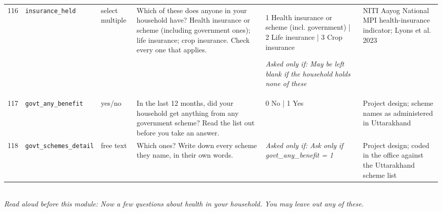 \documentclass[9pt,a4paper,landscape]{article}
\begin{document}
\begin{longtable}{@{}p{0.5cm}p{3.3cm}p{1.7cm}p{7.3cm}p{5.6cm}p{5.4cm}@{}}
\footnotesize 116 & \footnotesize\texttt{insurance\_held} & \scriptsize select multiple & \footnotesize Which of these does anyone in your household have? Health insurance or scheme (including government ones); life insurance; crop insurance. Check every one that applies.\par\vspace{1pt}{\footnotesize\color{hdr}{\hifont आपके घर में किसी के पास इनमें से क्या है? स्वास्थ्य बीमा या योजना (सरकारी भी); जीवन बीमा; फ़सल बीमा। जो लागू हो, वो सब चुनें।}} & \scriptsize 1 Health insurance or scheme (incl. government) | 2 Life insurance | 3 Crop insurance\par\vspace{1pt}\textit{Asked only if: May be left blank if the household holds none of these} & \scriptsize NITI Aayog National MPI health-insurance indicator; Lyons et al. 2023\\
\footnotesize 117 & \footnotesize\texttt{govt\_any\_benefit} & \scriptsize yes/no & \footnotesize In the last 12 months, did your household get anything from any government scheme? Read the list out before you take an answer.\par\vspace{1pt}{\footnotesize\color{hdr}{\hifont पिछले 12 महीनों में क्या आपके घर को किसी सरकारी योजना से कुछ मिला? जवाब लेने से पहले सूची पढ़कर सुनाइए।}} & \scriptsize 0 No | 1 Yes & \scriptsize Project design; scheme names as administered in Uttarakhand\\
\footnotesize 118 & \footnotesize\texttt{govt\_schemes\_detail} & \scriptsize free text & \footnotesize Which ones? Write down every scheme they name, in their own words.\par\vspace{1pt}{\footnotesize\color{hdr}{\hifont कौन-कौन सी? वे जितनी योजनाएँ बताएँ, सब उन्हीं के शब्दों में लिख लीजिए।}} & \scriptsize \textit{Asked only if: Ask only if govt\_any\_benefit = 1} & \scriptsize Project design; coded in the office against the Uttarakhand scheme list\\
\bottomrule\end{longtable}\vspace{6pt}
\\[3pt]
{\small\itshape Read aloud before this module: Now a few questions about health in your household. You may leave out any of these.}\\[5pt]
\end{document}
